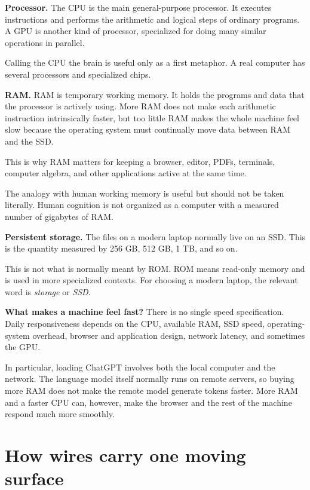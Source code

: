 \medskip\noindent
{\bf Processor.}
The CPU is the main general-purpose
processor. It executes instructions and
performs the arithmetic and logical steps
of ordinary programs. A GPU is another
kind of processor, specialized for doing
many similar operations in parallel.

Calling the CPU the brain is useful only
as a first metaphor. A real computer has
several processors and specialized chips.

\medskip\noindent
{\bf RAM.}
RAM is temporary working memory. It holds
the programs and data that the processor is
actively using. More RAM does not make
each arithmetic instruction intrinsically
faster, but too little RAM makes the whole
machine feel slow because the operating
system must continually move data between
RAM and the SSD.

This is why RAM matters for keeping a
browser, editor, PDFs, terminals, computer
algebra, and other applications active at
the same time.

The analogy with human working memory is
useful but should not be taken literally.
Human cognition is not organized as a
computer with a measured number of
gigabytes of RAM.

\medskip\noindent
{\bf Persistent storage.}
The files on a modern laptop normally live
on an SSD. This is the quantity measured
by 256 GB, 512 GB, 1 TB, and so on.

This is not what is normally meant by ROM.
ROM means read-only memory and is used in
more specialized contexts. For choosing a
modern laptop, the relevant word is
{\it storage} or {\it SSD}.

\medskip\noindent
{\bf What makes a machine feel fast?}
There is no single speed specification.
Daily responsiveness depends on the CPU,
available RAM, SSD speed, operating-system
overhead, browser and application design,
network latency, and sometimes the GPU.

In particular, loading ChatGPT involves
both the local computer and the network.
The language model itself normally runs on
remote servers, so buying more RAM does not
make the remote model generate tokens
faster. More RAM and a faster CPU can,
however, make the browser and the rest of
the machine respond much more smoothly.

\section{How wires carry one moving surface}
\label{section-surface-on-wires}

